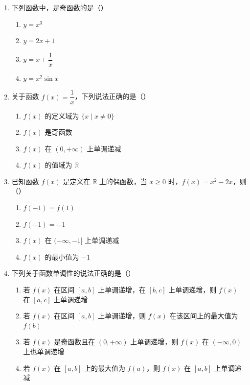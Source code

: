 \documentclass[12pt, a4paper]{ctexart}
\begin{document}
\begin{enumerate}[resume]
\item 下列函数中，是奇函数的是（\quad）
  \begin{enumerate}[label=\Alph*., itemsep=0pt]
    \item $y=x^3$
    \item $y=2x+1$
    \item $y=x+\dfrac{1}{x}$
    \item $y=x^2\sin x$
  \end{enumerate}

\item 关于函数 $f(x)=\dfrac{1}{x}$，下列说法正确的是（\quad）
  \begin{enumerate}[label=\Alph*., itemsep=0pt]
    \item $f(x)$ 的定义域为 $\{x\mid x\neq 0\}$
    \item $f(x)$ 是奇函数
    \item $f(x)$ 在 $(0,+\infty)$ 上单调递减
    \item $f(x)$ 的值域为 $\mathbb{R}$
  \end{enumerate}

\item 已知函数 $f(x)$ 是定义在 $\mathbb{R}$ 上的偶函数，当 $x\geq 0$ 时，$f(x)=x^2-2x$，则（\quad）
  \begin{enumerate}[label=\Alph*., itemsep=0pt]
    \item $f(-1)=f(1)$
    \item $f(-1)=-1$
    \item $f(x)$ 在 $(-\infty,-1]$ 上单调递减
    \item $f(x)$ 的最小值为 $-1$
  \end{enumerate}

\item 下列关于函数单调性的说法正确的是（\quad）
  \begin{enumerate}[label=\Alph*., itemsep=0pt]
    \item 若 $f(x)$ 在区间 $[a,b]$ 上单调递增，在 $[b,c]$ 上单调递增，则 $f(x)$ 在 $[a,c]$ 上单调递增
    \item 若 $f(x)$ 在区间 $[a,b]$ 上单调递增，则 $f(x)$ 在该区间上的最大值为 $f(b)$
    \item 若 $f(x)$ 是奇函数且在 $(0,+\infty)$ 上单调递增，则 $f(x)$ 在 $(-\infty,0)$ 上也单调递增
    \item 若 $f(x)$ 在 $[a,b]$ 上的最大值为 $f(a)$，则 $f(x)$ 在 $[a,b]$ 上单调递减
  \end{enumerate}
\end{enumerate}
\end{document}
